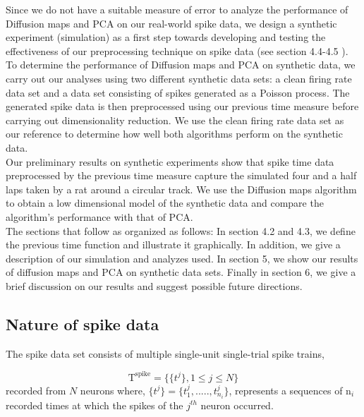 Since we do not have a suitable measure of error to analyze the performance of Diffusion maps and PCA on our
real-world spike data, we design a synthetic experiment (simulation)  as a first step towards  developing and testing the effectiveness of our preprocessing technique on spike data (see section 4.4-4.5 ).
To determine the performance of Diffusion maps and PCA on synthetic data, we carry out  our analyses  using two different synthetic data sets:  a clean firing rate data set and a data set consisting of spikes generated as a Poisson process.
The generated spike data is then preprocessed using our previous time measure before carrying out dimensionality reduction. We use the clean firing rate data set as our reference to determine how well both algorithms perform
on the  synthetic data.\\

Our preliminary results on synthetic experiments show that spike time data preprocessed by the previous time measure
capture the simulated four and a half laps taken by a rat around a circular track. We use the Diffusion maps algorithm 
to obtain a low dimensional model of the synthetic data and compare the algorithm's performance with that of PCA.\\

The sections that follow as organized as follows: In section  4.2 and 4.3,  we define the previous time function and illustrate it graphically.  In addition, we give a description of our simulation and analyzes used. In section 5, we show our results of diffusion maps and PCA on synthetic data sets. Finally in section 6, we give a brief discussion on our results and suggest possible future directions.

\subsection{Nature of spike  data}
The  spike  data  set consists  of multiple single-unit single-trial spike trains,

\[ 
\text{T}^{\text{spike}} = \displaystyle \{ \{ t^{j} \} ,  1 \leq j \leq N \}  
\]
recorded from $N$  neurons  where,
$\displaystyle  \{t^{j}\} =  \{t_{1}^{j}, ....., t_{n_{i}}^{j} \} $, represents  a sequences of n$_{i}$ recorded times at which the spikes of the $j^{th}$ neuron occurred. 

 

